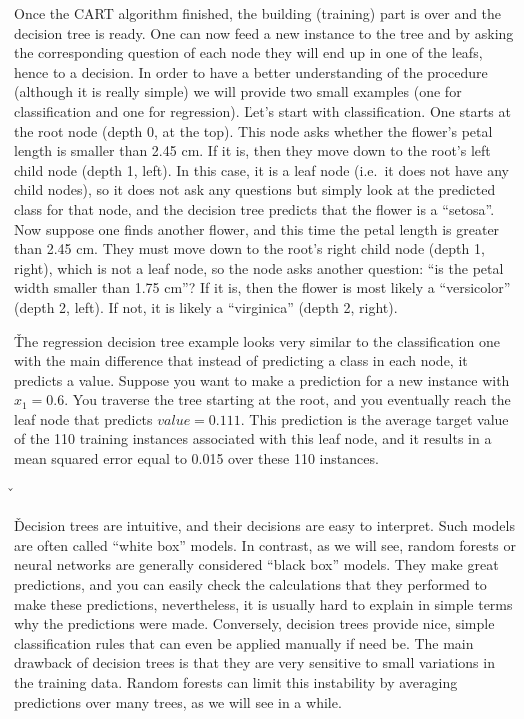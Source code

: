 Once the CART algorithm finished, the building (training) part is over and the decision tree is ready. One can now
feed a new instance to the tree and by asking the corresponding question of each node they will end up in one of the
leafs, hence to a decision. In order to have a better understanding of the procedure (although it is really simple)
we will provide two small examples (one for classification and one for regression). \v

Let's start with classification. One starts at the root node (depth 0, at the top). This node asks whether the
flower's petal length is smaller than 2.45 cm. If it is, then they move down to the root's left child node (depth 1,
left). In this case, it is a leaf node (i.e.\ it does not have any child nodes), so it does not ask any questions but
simply look at the predicted class for that node, and the decision tree predicts that the flower is a ``setosa''. Now
suppose one finds another flower, and this time the petal length is greater than 2.45 cm. They must move down to the
root's right child node (depth 1, right), which is not a leaf node, so the node asks another question: ``is the petal
width smaller than 1.75 cm''? If it is, then the flower is most likely a ``versicolor'' (depth 2, left). If not, it is
likely a ``virginica'' (depth 2, right).


\v

The regression decision tree example looks very similar to the classification one with the main difference that
instead of predicting a class in each node, it predicts a value. Suppose you want to make a prediction for a new
instance with $x_1 = 0.6$. You traverse the tree starting at the root, and you eventually reach the leaf node that
predicts $value=0.111$. This prediction is the average target value of the 110 training instances associated with
this leaf node, and it results in a mean squared error equal to 0.015 over these 110 instances.

\v


\v

Decision trees are intuitive, and their decisions are easy to interpret. Such models are often called ``white box''
models. In contrast, as we will see, random forests or neural networks are generally considered ``black box'' models.
They make great predictions, and you can easily check the calculations that they performed to make these predictions,
nevertheless, it is usually hard to explain in simple terms why the predictions were made. Conversely, decision trees
provide nice, simple classification rules that can even be applied manually if need be. The main drawback of decision
trees is that they are very sensitive to small variations in the training data. Random forests can limit this
instability by averaging predictions over many trees, as we will see in a while.

